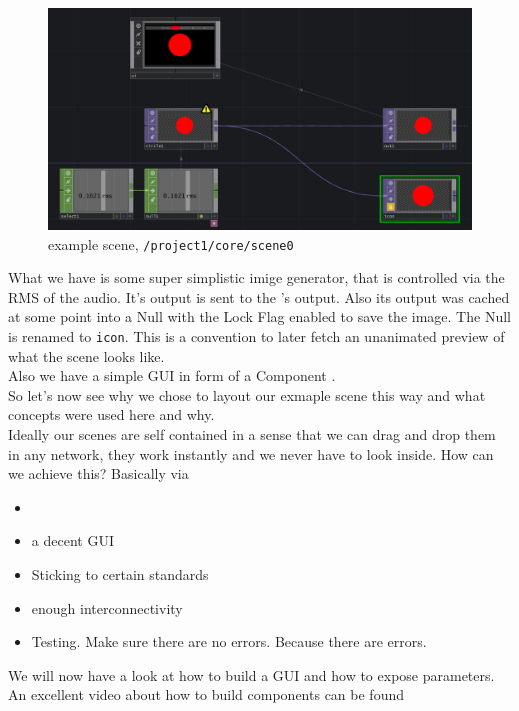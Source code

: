 \begin{figure}[H]
	\centering
	\includegraphics[width=\textwidth]{img/exampleScene.PNG}
	\caption[example scene]
	{example scene, \texttt{/project1/core/scene0}}
	\label{fig:label}
\end{figure}

What we have is some super simplistic imige generator, that is controlled via the RMS of the audio. It's output is sent to the \COMP's output. Also its output was cached at some point into a Null \TOP with the Lock Flag enabled to save the image. The Null \TOP is renamed to \texttt{icon}. This is a convention to later fetch an unanimated preview of what the scene looks like.\\
Also we have a simple GUI in form of a Component \COMP.\\
So let's now see why we chose to layout our exmaple scene this way and what concepts were used here and why.\\

Ideally our scenes are self contained in a sense that we can drag and drop them in any network, they work instantly and we never have to look inside. How can we achieve this? Basically via
\begin{itemize}
	\item {}
	\item a decent GUI
	\item Sticking to certain standards
	\item enough interconnectivity
	\item Testing. Make sure there are no errors. Because there are errors.
\end{itemize}

We will now have a look at how to build a GUI and how to expose parameters.
An excellent video about how to build components can be found 
